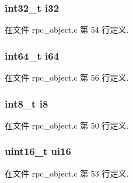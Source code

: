 \hypertarget{struct__krpc__number__t_a9183041de7aec86af61a14ffe5f3758e}{}
\subsubsection[{i32}]{\setlength{\rightskip}{0pt plus 5cm}int32\+\_\+t i32}\label{struct__krpc__number__t_a9183041de7aec86af61a14ffe5f3758e}


在文件 rpc\+\_\+object.\+c 第 54 行定义.

\hypertarget{struct__krpc__number__t_a35a9b0adab9f7ddb672b720854e419be}{}
\subsubsection[{i64}]{\setlength{\rightskip}{0pt plus 5cm}int64\+\_\+t i64}\label{struct__krpc__number__t_a35a9b0adab9f7ddb672b720854e419be}


在文件 rpc\+\_\+object.\+c 第 56 行定义.

\hypertarget{struct__krpc__number__t_a6063c64fb40618934bcb10217c6c705f}{}
\subsubsection[{i8}]{\setlength{\rightskip}{0pt plus 5cm}int8\+\_\+t i8}\label{struct__krpc__number__t_a6063c64fb40618934bcb10217c6c705f}


在文件 rpc\+\_\+object.\+c 第 50 行定义.

\hypertarget{struct__krpc__number__t_a231ad60c817fdbd5e4bc821518c9f45a}{}
\subsubsection[{ui16}]{\setlength{\rightskip}{0pt plus 5cm}uint16\+\_\+t ui16}\label{struct__krpc__number__t_a231ad60c817fdbd5e4bc821518c9f45a}


在文件 rpc\+\_\+object.\+c 第 53 行定义.

